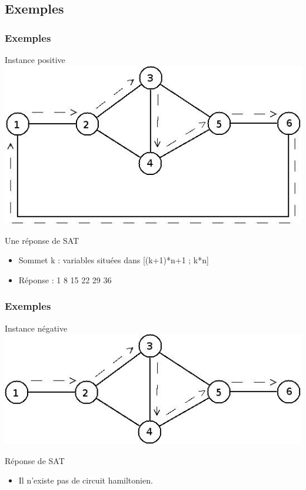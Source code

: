 \subsection{Exemples}

\begin{frame}
\frametitle{Exemples}
\begin{block}{Instance positive}
\includegraphics[scale=0.3]{positif.jpeg}
\end{block}
\begin{block}{Une r\'eponse de SAT}
  \begin{itemize}
  \item Sommet k : variables situ\'ees dans [(k+1)*n+1 ; k*n]
  \item R\'eponse : 1 8 15 22 29 36 
  \end{itemize}
\end{block}
\end{frame}

\begin{frame}
\frametitle{Exemples}
\begin{block}{Instance n\'egative}
\includegraphics[scale=0.3]{negatif.jpeg}
\end{block}
\begin{block}{R\'eponse de SAT}
  \begin{itemize}
  \item Il n'existe pas de circuit hamiltonien.
  \end{itemize}
\end{block}
\end{frame}
